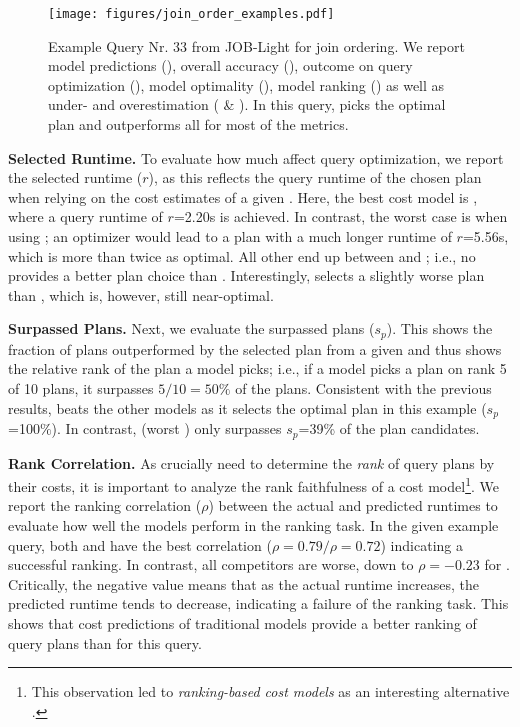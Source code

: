\begin{figure*}[]
    \centering
    \texttt{[image: figures/join\_order\_examples.pdf]}
    \caption{Example Query Nr. 33 from JOB-Light for join ordering. 
    We report model predictions (), overall accuracy (), outcome on query optimization (),  model optimality (), model ranking () as well as under- and overestimation ( \& ).
    In this query, \postgresx picks the optimal plan and outperforms all \lcms for most of the metrics.}
    \label{fig:join_order_example}
\end{figure*}



\textbf{ Selected Runtime.}
To evaluate how much \lcms affect query optimization, we report the selected runtime ($r$), as this reflects the query runtime of the chosen plan when relying on the cost estimates of a given \lcm.
Here, the best cost model is \postgresx, where a query runtime of $r$=2.20s is achieved.
In contrast, the worst case is when using \queryformer; an optimizer would lead to a plan with a much longer runtime of $r$=5.56s, which is more than twice as optimal.
All other \lcms end up between \postgresx and \queryformer; i.e., no \lcm provides a better plan choice than \postgresx.
Interestingly, \postgresxvi selects a slightly worse plan than \postgresx, which is, however, still near-optimal. 

\textbf{ Surpassed Plans.}
Next, we evaluate the surpassed plans ($s_p$).
This shows the fraction of plans outperformed by the selected plan from a given \lcm and thus shows the relative rank of the plan a model picks; i.e., if a model picks a plan on rank 5 of 10 plans, it surpasses $5/10=50\%$ of the plans.
Consistent with the previous results, \postgres beats the other models as it selects the optimal plan in this example ($s_p$=100$\%$).
In contrast, \queryformer (worst \lcm) only surpasses $s_p$=39\% of the plan candidates.

\textbf{ Rank Correlation.}
As \lcms crucially need to determine the \textit{rank} of query plans by their costs, it is important to analyze the rank faithfulness of a cost model\footnote{
This observation led to \textit{ranking-based cost models} as an interesting alternative \cite{behr2023, chen2023, zhu2023}.}.
We report the ranking correlation ($\rho$) between the actual and predicted runtimes to evaluate how well the models perform in the ranking task.
In the given example query, both \postgresx and \postgresxvi have the best correlation ($\rho=0.79/ \rho=0.72$) indicating a successful ranking.
In contrast, all \lcm competitors are worse, down to $\rho = -0.23$ for \queryformer. 
Critically, the negative value means that as the actual runtime increases, the predicted runtime tends to decrease, indicating a failure of the ranking task.
This shows that cost predictions of traditional models provide a better ranking of query plans than \lcms for this query.

